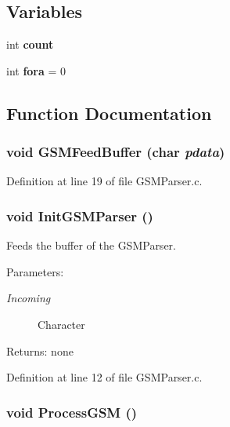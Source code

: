 \subsection*{Variables}
\begin{CompactItemize}
\item 
int {\bf count}
\item 
int {\bf fora} = 0
\end{CompactItemize}


\subsection{Function Documentation}
\subsubsection{\setlength{\rightskip}{0pt plus 5cm}void GSMFeedBuffer (char {\em pdata})}\label{_g_s_m_parser_8c_afe2bd5505a916da6c8b945dd30f1f7b}




Definition at line 19 of file GSMParser.c.
\subsubsection{\setlength{\rightskip}{0pt plus 5cm}void InitGSMParser ()}\label{_g_s_m_parser_8c_2d76fb153afd5a39bd0e362f9268103b}


Feeds the buffer of the GSMParser. 

\begin{Desc}
\item[Parameters:]
\begin{description}
\item[{\em Incoming}]Character \end{description}
\end{Desc}
\begin{Desc}
\item[Returns:]none \end{Desc}


Definition at line 12 of file GSMParser.c.
\subsubsection{\setlength{\rightskip}{0pt plus 5cm}void ProcessGSM ()}\label{_g_s_m_parser_8c_874ee7f889281e115898b3ac58bf7c13}



